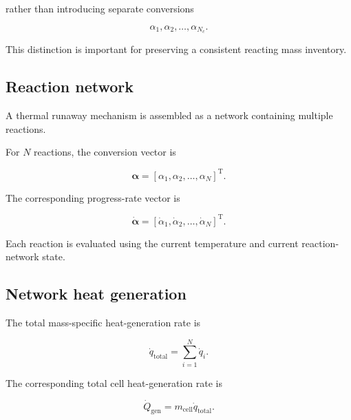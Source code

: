 rather than introducing separate conversions

\begin{equation}
    \alpha_1,
    \alpha_2,
    \ldots,
    \alpha_{N_c}.
\end{equation}

This distinction is important for preserving a consistent reacting mass
inventory.


\subsection{Reaction network}

A thermal runaway mechanism is assembled as a network containing
multiple reactions.

For $N$ reactions, the conversion vector is

\begin{equation}
    \boldsymbol{\alpha}
    =
    \left[
        \alpha_1,
        \alpha_2,
        \ldots,
        \alpha_N
    \right]^{\mathrm{T}}.
\end{equation}

The corresponding progress-rate vector is

\begin{equation}
    \dot{\boldsymbol{\alpha}}
    =
    \left[
        \dot{\alpha}_1,
        \dot{\alpha}_2,
        \ldots,
        \dot{\alpha}_N
    \right]^{\mathrm{T}}.
\end{equation}

Each reaction is evaluated using the current temperature and current
reaction-network state.


\subsection{Network heat generation}

The total mass-specific heat-generation rate is

\begin{equation}
    \dot{q}_{\mathrm{total}}
    =
    \sum_{i=1}^{N}
    \dot{q}_i.
    \label{eq:network_specific_heat}
\end{equation}

The corresponding total cell heat-generation rate is

\begin{equation}
    \dot{Q}_{\mathrm{gen}}
    =
    m_{\mathrm{cell}}
    \dot{q}_{\mathrm{total}}.
    \label{eq:network_total_heat}
\end{equation}

